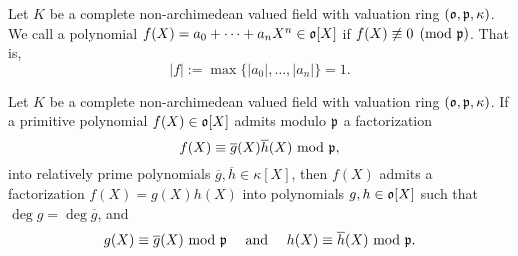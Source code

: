 \begin{definition}
    Let $K$ be a complete non-archimedean valued field with valuation ring $(\mathfrak{o},\mathfrak{p},\kappa)$. We call a polynomial $f(X) = a_0 + \cdots + a_nX^n\in\mathfrak{o}[X]$  if $f(X)\not\equiv0\pmod{\mathfrak{p}}$. That is, 
    \begin{equation*}
        |f| := \max\{|a_0|,\dots,|a_n|\} = 1.
    \end{equation*}
\end{definition}

\begin{lemma}
    Let $K$ be a complete non-archimedean valued field with valuation ring $(\mathfrak{o}, \mathfrak{p},\kappa)$. If a primitive polynomial $f(X)\in\mathfrak{o}[X]$ admits modulo $\mathfrak{p}$ a factorization 
    \begin{equation*}
        f(X)\equiv\overline g(X)\overline h(X)~\mathrm{mod}~\mathfrak{p},
    \end{equation*}
    into relatively prime polynomials $\overline g,\overline h\in\kappa[X]$, then $f(X)$ admits a factorization $f(X) = g(X)h(X)$ into polynomials $g, h\in\mathfrak{o}[X]$ such that $\deg g = \deg\overline g$, and 
    \begin{equation*}
        g(X)\equiv\overline g(X)~\mathrm{mod}~\mathfrak{p}\quad\text{ and }\quad h(X)\equiv\overline{h}(X)~\mathrm{mod}~\mathfrak{p}.
    \end{equation*}
\end{lemma}
